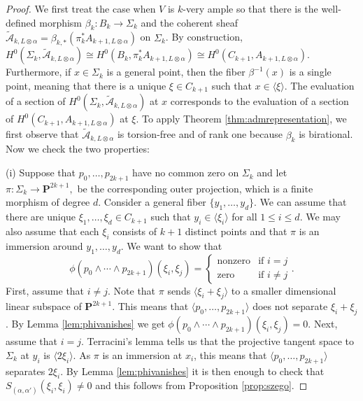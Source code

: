 \documentclass[10pt,a4paper]{amsart}
\newcommand{\nP}{\mathbf{P}}
\newcommand{\sA}{\mathscr{A}}
\begin{document}
\begin{proof}
	We first treat the case when $V$ is $k$-very ample so that there is  the well-defined morphism $\beta_k\colon B_k \longrightarrow \Sigma_k$ and the  coherent sheaf $\widetilde{\sA}_{k,L\otimes \alpha} = \beta_{k,*}(\pi_k^* A_{k+1,L\otimes \alpha})$ on $\Sigma_k$. By construction, $H^0(\Sigma_k,\widetilde{\sA}_{k,L\otimes \alpha}) \cong H^0(B_k,\pi_k^*A_{k+1,L\otimes \alpha}) \cong H^0(C_{k+1},A_{k+1,L\otimes \alpha})$. Furthermore, if $x \in \Sigma_k$ is a general point, then the fiber $\beta^{-1}(x)$ is a single point, meaning that there is a unique $\xi\in C_{k+1}$ such that $x\in \langle \xi \rangle$. The evaluation of a section of $H^0(\Sigma_k,\widetilde{\sA}_{k,L\otimes \alpha})$ at $x$ corresponds to the evaluation of a section of $H^0(C_{k+1},A_{k+1,L\otimes \alpha})$ at $\xi$. To apply Theorem \ref{thm:admrepresentation}, we first observe that $\widetilde{\sA}_{k,L\otimes \alpha}$ is torsion-free and of rank one because $\beta_k$ is birational.  Now we check the two properties:
	\medskip

	\noindent
	(i)  Suppose that $p_0, \ldots, p_{2k+1}$ have no common zero on $\Sigma_k$ and let
	$
	\pi  \colon \Sigma_k \longrightarrow \nP^{2k+1},
	$
	be the corresponding outer projection,
	which is a finite morphism of degree $d$. Consider a general fiber $\{y_1, \ldots, y_d\}$. We can assume that there are unique $\xi_1, \ldots, \xi_d \in C_{k+1}$ such that $y_i \in \langle \xi_i \rangle$ for all $1 \leq i \leq d$. We may also assume that each $\xi_i$ consists of $k+1$ distinct points and that $\pi$ is an immersion around $y_1, \ldots, y_d$. We want to show that
	$$
	\phi(p_0 \wedge \cdots \wedge p_{2k+1})(\xi_i, \xi_j) =
	\begin{cases} \text{nonzero} & \text{if $i=j$} \\ \text{zero} & \text{if $i \neq j$} \end{cases}.
	$$
	First, assume that $i \neq j$. Note that $\pi$ sends $\langle \xi_i + \xi_j \rangle$ to a smaller dimensional linear subspace of $\nP^{2k+1}$. This means that $\langle p_0,\dots,p_{2k+1}\rangle$ does not separate $\xi_i+\xi_j$. By Lemma \ref{lem:phivanishes} we get $\phi(p_0 \wedge \cdots \wedge p_{2k+1})(\xi_i, \xi_j) = 0$. Next, assume that $i=j$. Terracini's lemma tells us that the projective tangent space to $\Sigma_{k}$ at $y_i$ is $\langle 2\xi_i \rangle$. As $\pi$ is an immersion at $x_i$, this means that $\langle p_0,\dots,p_{2k+1} \rangle$ separates $2\xi_i$. By Lemma \ref{lem:phivanishes} it is then enough to check that $S_{(\alpha,\alpha')}(\xi_i,\xi_i)\ne 0$ and this follows from Proposition \ref{prop:szego}.
	\medskip


\end{proof}
\end{document}

